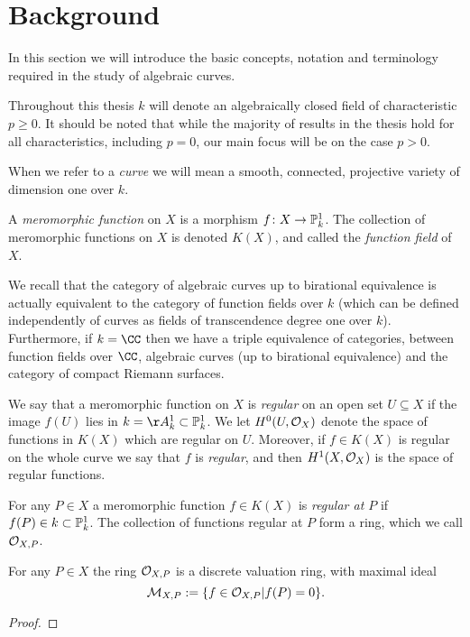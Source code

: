 \chapter{Background}\label{chapterbackground}

In this section we will introduce the basic concepts, notation and terminology required in the study of algebraic curves.

Throughout this thesis $k$ will denote an algebraically closed field of characteristic $p \geq 0$.
It should be noted that while the majority of results in the thesis hold for all characteristics, including $p=0$, our main focus will be on the case $p > 0$.

When we refer to a \emph{curve} we will mean a smooth, connected, projective variety of dimension one over $k$.


A \emph{meromorphic function} on $X$ is a morphism $f \colon X \rightarrow {\mathbb P}_k^1$.
The collection of meromorphic functions on $X$ is denoted $K(X)$, and called the \emph{function field} of $X$.

We recall that the category of algebraic curves up to birational  equivalence is actually equivalent to the category of function fields over $k$ (which can be defined independently of curves as fields of transcendence degree one over $k$).
Furthermore, if $k = \CC$ then we have a triple equivalence of categories, between function fields over $\CC$, algebraic curves (up to birational equivalence) and the category of compact Riemann surfaces.

We say that a meromorphic function on $X$ is \emph{regular} on an open set $U \subseteq X$ if the image $f(U)$ lies in $k = \AA_k^1 \subset \PP_k^1$.
We let $H^0(U,{\cal O}_X)$ denote the space of functions in $K(X)$ which are regular on $U$.
Moreover, if $f \in K(X)$ is regular on the whole curve we say that $f$ is \emph{regular}, and then $H^1(X,{\cal O}_X)$ is the space of regular functions.

For any $P \in X$ a meromorphic function $f \in K(X)$ is \emph{regular at $P$} if $f(P) \in k \subset {\mathbb P}_k^1$.
The collection of functions regular at $P$ form a ring, which we call ${\cal O}_{X,P}$.

    \begin{lem}
    For any $P \in X$ the ring ${\cal O}_{X,P}$ is a discrete valuation ring, with maximal ideal
        \[
        \mathcal {M}_{X,P} := \{ f \in {\cal O}_{X,P} | f(P) = 0 \}.
        \]
    \end{lem}
    \begin{proof}
    \end{proof}

